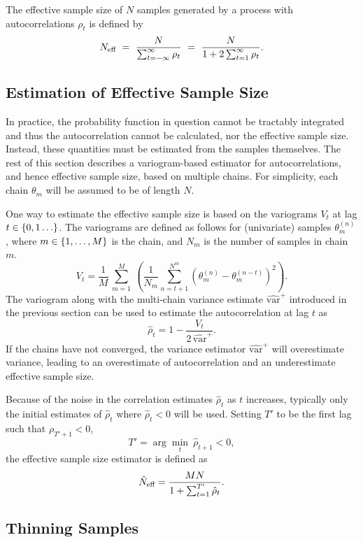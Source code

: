 The effective sample size of $N$ samples generated by a process with
autocorrelations $\rho_t$ is defined by
\[
N_{\mbox{\scriptsize eff}}
\ = \
\frac{N}{\sum_{t = -\infty}^{\infty} \rho_t}
\ = \
\frac{N}{1 + 2 \sum_{t = 1}^{\infty} \rho_t}.
\]

\subsection{Estimation of Effective Sample Size}

In practice, the probability function in question cannot be tractably
integrated and thus the autocorrelation cannot be calculated, nor the
effective sample size.  Instead, these quantities must be estimated
from the samples themselves.  The rest of this section describes a
variogram-based estimator for autocorrelations, and hence effective sample
size, based on multiple chains. For simplicity, each chain
$\theta_m$ will be assumed to be of length $N$.

One way to estimate the effective sample size is based on the
variograms $V_t$ at lag $t \in \{ 0,1\ldots \}$.  The variograms are
defined as follows for (univariate) samples $\theta_m^{(n)}$, where $m \in
\{ 1,\ldots,M \}$ is the chain, and $N_m$ is the number of samples
in chain $m$.
\[
V_t = 
\frac{1}{M}
\,
\sum_{m=1}^M 
\
\left(
\frac{1}{N_m}
\sum_{n=t+1}^{N^m}
\left(
\theta_m^{(n)} - \theta_m^{(n-t)}
\right)^2
\right).
\]
%
The variogram along with the multi-chain variance estimate
$\widehat{\mbox{var}}^{+}$ introduced in the previous section can be
used to estimate the autocorrelation at lag $t$ as
\[
\hat{\rho}_t
= 1 - \frac{\displaystyle V_t}{
            \displaystyle 2 \, \widehat{\mbox{var}}^{+}}.
\]
If the chains have not converged, the variance estimator
$\widehat{\mbox{var}}^{+}$ will overestimate variance, 
leading to an overestimate of autocorrelation and an underestimate
effective sample size.

Because of the noise in the correlation estimates $\hat{\rho}_t$ as $t$
increases, typically only the initial estimates of $\hat{\rho}_t$
where $\hat{\rho}_t < 0$ will be used.  Setting $T'$ to be the
first lag such that $\rho_{T' + 1} < 0$, 
\[
T' = \arg\min_t \ \hat{\rho}_{t+1} < 0,
\]
the effective sample size estimator is defined as
\[
\hat{N}_{\mbox{\scriptsize eff}}
= 
\frac{MN}
     {1 + \sum_{t=1}^{T'} \hat{\rho}_t}.
\]

\subsection{Thinning Samples}

